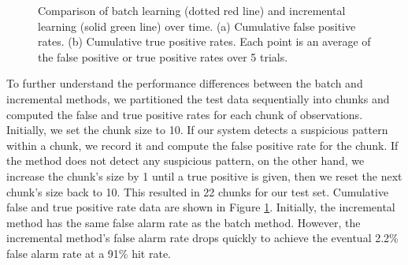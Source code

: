 \begin{figure}[t]
  \centering
  \caption[Comparison of batch learning and incremental learning over
    time.]{\small Comparison of batch learning (dotted red line) and
    incremental learning (solid green line) over time.  (a) Cumulative
    false positive rates. (b) Cumulative true positive rates.  Each
    point is an average of the false positive or true positive rates
    over 5 trials.}
  \label{fig:chunking-results}
\end{figure}

To further understand the performance differences between the batch
and incremental methods, we partitioned the test data sequentially
into chunks and computed the false and true positive rates for each
chunk of observations.  Initially, we set the chunk size to 10. If our
system detects a suspicious pattern within a chunk, we record it and
compute the false positive rate for the chunk. If the method does not
detect any suspicious pattern, on the other hand, we increase the
chunk's size by 1 until a true positive is given, then we reset the
next chunk's size back to 10. This resulted in 22 chunks for our test
set. Cumulative false and true positive rate data are shown in
Figure \ref{fig:chunking-results}. Initially, the incremental
method has the same false alarm rate as the batch method.  However,
the incremental method's false alarm rate drops quickly to achieve the
eventual 2.2\% false alarm rate at a 91\% hit rate.

